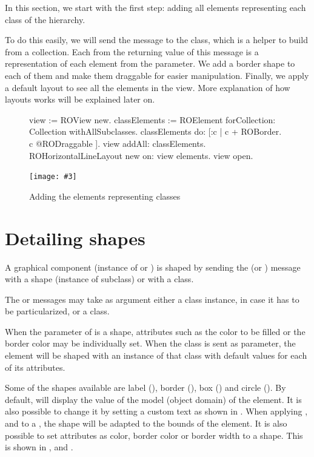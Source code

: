 \documentclass[a4paper,10pt,twoside]{book}
\newcommand{\fig}[4]{
		\begin{figure}[#1]
			\centering
			\texttt{[image: \#3]}
			\caption{\label{fig:#3}#4}
		\end{figure}}
\begin{document}
In this section, we start with the first step: adding all elements representing each class of the hierarchy. 

To do this easily, we will send the  message to the  class, which is a helper to build  from a collection. 
Each  from the returning value of this message is a representation of each element from the parameter. 
We add a border shape to each of them and make them draggable for easier manipulation.
Finally, we apply a default layout to see all the elements in the view. 
More explanation of how layouts works will be explained later on. 


\begin{figure}[H]
\begin{code}{}
view := ROView new.
classElements := ROElement forCollection: Collection withAllSubclasses.
classElements 
	do: [:c | c + ROBorder.
			c @RODraggable ].
view addAll: classElements.
ROHorizontalLineLayout new on: view elements.
view open.
\end{code}
\end{figure}

\fig{H}{0.6}{hier1}{Adding the elements representing classes}


\section{Detailing shapes} 

A graphical component (instance of  or ) is shaped by sending the \ct{+} (or ) message with a shape (instance of  subclass) or with a  class. 

The \ct{+} or  messages may take as argument either a class instance, in case it has to be particularized, or a class. 

When the parameter of \ct{+} is a shape, attributes such as the color to be filled or the border color may be individually set. When the class is sent as parameter, the element will be shaped with an instance of that class with default values for each of its attributes.

Some of the shapes available are label (), border (), box () and circle (). By default,  will display the  value of the model (\ie object domain) of the element. It is also possible to change it by setting a custom text as shown in . When applying ,  and  to a , the shape will be adapted to the bounds of the element. It is also possible to set attributes as color, border color or border width to a shape. This is shown in ,  and .
\end{document}
